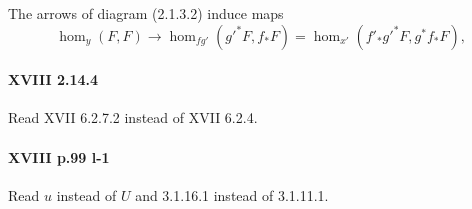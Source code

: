 The arrows of diagram (2.1.3.2) induce maps
\[
  \hom_y(F,F) \to \hom_{f g'}({g'}^\ast F,f_\ast F) = \hom_{x'}(f'_\ast {g'}^\ast F,g^\ast f_\ast F) \text{,}
\]

\paragraph{XVIII 2.14.4}
Read XVII 6.2.7.2 instead of XVII 6.2.4.

\paragraph{XVIII p.99 l-1}
Read $u$ instead of $U$ and 3.1.16.1 instead of 3.1.11.1.

